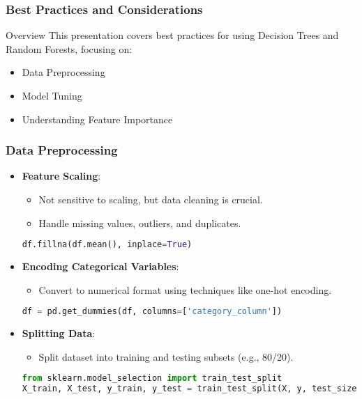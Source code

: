 \documentclass[aspectratio=169]{beamer}
\begin{document}
\begin{frame}
    \frametitle{Best Practices and Considerations}
    \begin{block}{Overview}
        This presentation covers best practices for using Decision Trees and Random Forests, focusing on:
        \begin{itemize}
            \item Data Preprocessing
            \item Model Tuning
            \item Understanding Feature Importance
        \end{itemize}
    \end{block}
\end{frame}

\begin{frame}[fragile]
    \frametitle{Data Preprocessing}
    \begin{itemize}
        \item \textbf{Feature Scaling}:
        \begin{itemize}
            \item Not sensitive to scaling, but data cleaning is crucial.
            \item Handle missing values, outliers, and duplicates.
            \end{itemize}
            \begin{lstlisting}[language=Python]
df.fillna(df.mean(), inplace=True)
            \end{lstlisting}
        
        \item \textbf{Encoding Categorical Variables}:
        \begin{itemize}
            \item Convert to numerical format using techniques like one-hot encoding.
            \end{itemize}
            \begin{lstlisting}[language=Python]
df = pd.get_dummies(df, columns=['category_column'])
            \end{lstlisting}

        \item \textbf{Splitting Data}:
        \begin{itemize}
            \item Split dataset into training and testing subsets (e.g., 80/20).
            \end{itemize}
            \begin{lstlisting}[language=Python]
from sklearn.model_selection import train_test_split
X_train, X_test, y_train, y_test = train_test_split(X, y, test_size=0.2, random_state=42)
            \end{lstlisting}
    \end{itemize}
\end{frame}
\end{document}
